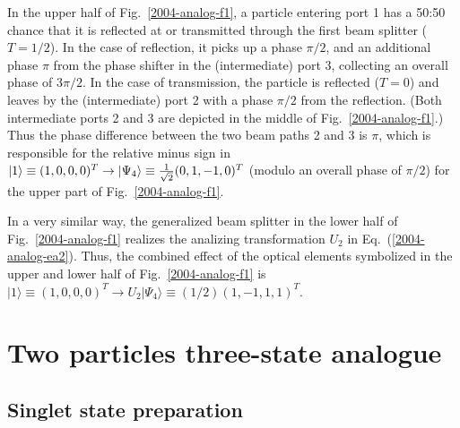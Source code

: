 \documentclass[12pt]{iopart}
\begin{document}
In the upper half of Fig.~\ref{2004-analog-f1},
a particle entering port 1 has a 50:50 chance that
it is reflected at or transmitted through the first beam splitter ($T=1/2$).
In the case of reflection, it picks up a phase $\pi /2$, and an additional phase $\pi$
from the phase shifter in the (intermediate) port 3, collecting an overall phase of $3\pi /2$.
In the case of transmission, the particle is reflected  ($T=0$)
and leaves by the (intermediate) port 2 with a phase $\pi /2$ from the reflection.
(Both intermediate ports 2 and 3 are depicted in the middle of Fig.~\ref{2004-analog-f1}.)
Thus the phase difference between the two beam paths 2 and 3 is $\pi$,
which is responsible for the relative minus sign in
$\vert 1\rangle \equiv (1,0,0,0)^T
\rightarrow
\vert \Psi_4 \rangle \equiv {1\over \sqrt{2}}(0,1,-1,0)^T$
(modulo an overall phase of $\pi /2$) for the upper part of Fig.~\ref{2004-analog-f1}.



In a very similar way, the generalized beam splitter
in the lower half of Fig.~\ref{2004-analog-f1} realizes
the analizing transformation
$U_2$ in Eq.~(\ref{2004-analog-ea2}).
Thus, the combined effect of the optical elements symbolized
in the upper and lower half of Fig.~\ref{2004-analog-f1}
is $\vert 1\rangle \equiv (1,0,0,0)^T
\rightarrow
U_{2}\vert \Psi_4\rangle \equiv (1/2)(1,-1,1,1)^T$.



\section{Two particles three-state analogue}
\label{2004-analog-2p3s}

\subsection{Singlet state preparation}
\end{document}
